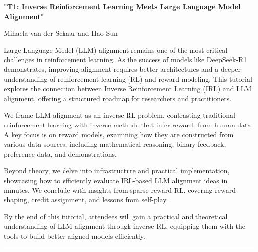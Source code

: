 \begin{center}
    \Large{\textbf{"T1: Inverse Reinforcement Learning Meets Large Language Model Alignment"}\\}
    \par\bigskip
    \large{Mihaela van der Schaar and Hao Sun}\\
    \par\bigskip

\end{center}

Large Language Model (LLM) alignment remains one of the most critical challenges in reinforcement learning. As the success of models like DeepSeek-R1 demonstrates, improving alignment requires better architectures and a deeper understanding of reinforcement learning (RL) and reward modeling. This tutorial explores the connection between Inverse Reinforcement Learning (IRL) and LLM alignment, offering a structured roadmap for researchers and practitioners.

We frame LLM alignment as an inverse RL problem, contrasting traditional reinforcement learning with inverse methods that infer rewards from human data. A key focus is on reward models, examining how they are constructed from various data sources, including mathematical reasoning, binary feedback, preference data, and demonstrations.

Beyond theory, we delve into infrastructure and practical implementation, showcasing how to efficiently evaluate IRL-based LLM alignment ideas in minutes. We conclude with insights from sparse-reward RL, covering reward shaping, credit assignment, and lessons from self-play.

By the end of this tutorial, attendees will gain a practical and theoretical understanding of LLM alignment through inverse RL, equipping them with the tools to build better-aligned models efficiently.

\begin{center}
    \noindent\rule{200px}{1pt}
\end{center}
